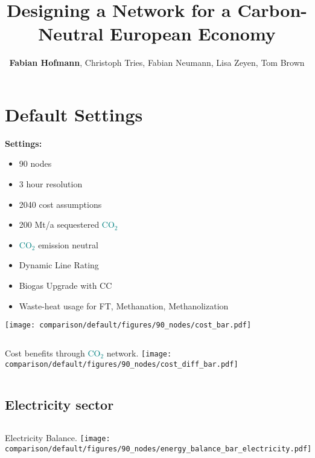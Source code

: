 \documentclass[12pt, aspectratio=169]{beamer}
\title{Designing a \carbon{} Network for a Carbon-Neutral European Economy}
\author{\textbf{Fabian Hofmann}, Christoph Tries, Fabian Neumann, Lisa Zeyen, Tom Brown}
\institute{Technical University Berlin}
\date{}
\newcommand{\carbon}{\textcolor{teal}{CO$_2$}}
\begin{document}
\begin{frame}[plain]
    \titlepage
\end{frame}


\section*{Default Settings}

\begin{frame}
    \textbf{Settings:}
    \begin{itemize}
        \item 90 nodes
        \item 3 hour resolution
        \item 2040 cost assumptions
        \item 200 Mt/a sequestered \carbon{}
        \item \carbon{} emission neutral
        \item Dynamic Line Rating
        \item Biogas Upgrade with CC
        \item Waste-heat usage for FT, Methanation, Methanolization
    \end{itemize}
\end{frame}

\begin{frame}
        \texttt{[image: comparison/default/figures/90\_nodes/cost\_bar.pdf]}
\end{frame}

\begin{frame}
    \begin{columns}
        Cost benefits through \carbon{} network.
        \texttt{[image: comparison/default/figures/90\_nodes/cost\_diff\_bar.pdf]}
    \end{columns}
\end{frame}

\subsection*{Electricity sector}

\begin{frame}
    \begin{columns}
        Electricity Balance.
        \texttt{[image: comparison/default/figures/90\_nodes/energy\_balance\_bar\_electricity.pdf]}
    \end{columns}
\end{frame}
\end{document}

